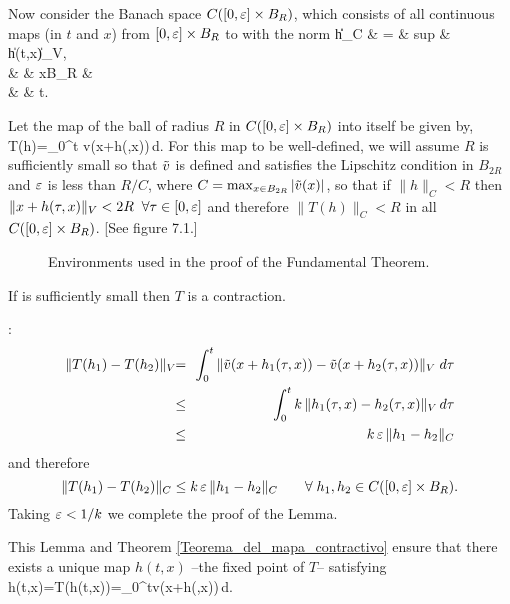 Now consider the Banach space $C([0,\mbox{$\varepsilon$}]\times B_R)$, which consists
of all continuous maps (in $t$ and $x$) from $[0,\mbox{$\varepsilon$}]\times B_R$
to \ren{} with the norm 
\beq{}
     \|h\|_C & = & sup & \|h(t,x)\|_V\;\;, \\
             &   & x\in B_R & \\
             &   & t\in[0,\eps].
             \earr
\eeq

Let the map of the ball of radius $R$ in $C([0,\mbox{$\varepsilon$} ]\times B_R)$ into itself be given by,
\beq
T(h)=\int_0^t \ti v(x+h(\tau,x))\,d\tau\;\;.
\eeq
For this map to be well-defined, we will assume $R$ is
sufficiently small so that $\tilde v$ is defined and
satisfies the Lipschitz condition in $B_{2R}$ and $\mbox{$\varepsilon$}$ is less than
$R/C$, where \hfill 
$C=\max_{x\in B_{2R}} |\tilde v(x)|$, so that 
if $\|h\|_C < R$ then $\|x+h(\tau,x)\|_V < 2R \;\;\forall \tau\in[0,\mbox{$\varepsilon$}]$
and therefore
$\|T(h)\|_C < R$ in all $C([0,\mbox{$\varepsilon$} ]\times B_R)$. [See figure 7.1.] 

\espa 
\espa 

\begin{figure}[htbp]
  \begin{center}
    \caption{Environments used in the proof of the Fundamental Theorem.}
    \label{fig:7_1}
  \end{center}
\end{figure}


\blem
If \eps{} is sufficiently small then $T$ is a contraction.
\elem

\espa
\pru:
\begin{eqnarray*}
\|T(h_1)-T(h_2)\|_V  \!\! &=& \!\!
           \int_0^t\|\ti v(x+h_1(\tau,x))-\ti v(x+h_2(\tau,x))\|_V\;d\tau \\
\!\! &\leq& \!\!\int_0^t k\,\|h_1(\tau,x)-h_2(\tau,x)\|_V \,d\tau\\
\!\! &\leq& \!\! k\,\eps\,\|h_1-h_2\|_C
\end{eqnarray*}
%                                         
and therefore
\[
\|T(h_1)-T(h_2)\|_C\leq k\,\mbox{$\varepsilon$}\,\|h_1-h_2\|_C\;\;\;\;\;\;\;\forall
\;h_1,h_2\in C([0,\mbox{$\varepsilon$}]\times B_R).
\]
%
Taking $\mbox{$\varepsilon$}<1/k $ we complete the proof of the Lemma.

This Lemma and Theorem \ref{Teorema_del_mapa_contractivo} ensure 
that there exists a unique map $h(t,x)$ --the fixed point of $T$-- satisfying
\beq
h(t,x)=T(h(t,x))=\int_0^t\ti v(x+h(\tau,x))\,d\tau .
\label{7**}
\eeq

